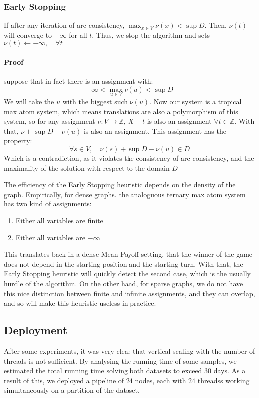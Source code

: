 \subsubsection{Early Stopping}
If after any iteration of arc consistency, $\max_{x\in V}\nu(x) < \sup D.$ Then, $\nu(t)$ will converge to $-\infty$ for all $t.$ 
\newline Thus, we stop the algorithm and sets $\nu(t)\leftarrow -\infty,\quad \forall t$
\paragraph{Proof} suppose that in fact there is an assignment with: 
$$
-\infty < \max_{u\in V}\nu(u) < \sup D$$
We will take the $u$ with the biggest such $\nu(u).$  
\newline Now our system is a tropical max atom system, which means translations are also a polymorphism of this system, so for any assignment $\nu:V\rightarrow\mathbb{Z},\ X+t$ is also an assignment $\forall t\in \mathbb{Z}.$ With that, $\nu+\sup D-\nu(u)$ is also an assignment.
\newline This assignment has the property: $$
\forall s\in V,\quad \nu(s)+\sup D-\nu(u) \in D
$$
Which is a contradiction, as it violates the consistency of arc consistency, and the maximality of the solution with respect to the domain $D$

  
The efficiency of the Early Stopping heuristic depends on the density of the graph. Empirically, for dense graphs. the analoguous ternary max atom system has two kind of assignments:
\begin{enumerate}
	\item Either all variables are finite
	\item Either all variables are $-\infty$
\end{enumerate}
This translates back in a dense Mean Payoff setting, that the winner of the game does not depend in the starting position and the starting turn. 
\newline With that, the Early Stopping heuristic will quickly detect the second case, which is the usually hurdle of the algorithm.
\newline On the other hand, for sparse graphs, we do not have this nice distinction between finite and infinite assignments, and they can overlap, and so will make this heuristic useless in practice.

\subsection{Deployment}
After some experiments, it was very clear that vertical scaling with the number of threads is not sufficient. By analysing the running time of some samples, we estimated the total running time solving both datasets to exceed $30$ days.
\newline As a result of this, we deployed a pipeline of $24$ nodes, each with $24$ threadss working simultaneously on a partition of the dataset.
